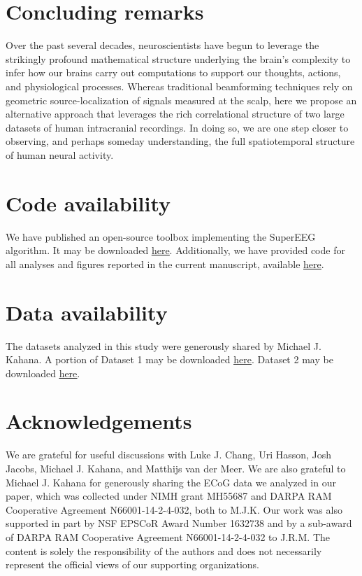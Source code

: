 \documentclass[11pt]{article}
\begin{document}
\section*{Concluding remarks}
Over the past several decades, neuroscientists
have begun to leverage the strikingly profound mathematical structure underlying
the brain's complexity to infer how our brains carry out computations to support
our thoughts, actions, and physiological processes.  Whereas traditional
beamforming techniques rely on geometric source-localization of signals measured
at the scalp, here we propose an alternative approach that leverages the rich
correlational structure of two large datasets of human intracranial recordings.
In doing so, we are one step closer to observing, and perhaps someday
understanding, the full spatiotemporal structure of human neural activity.

\section*{Code availability}
We have published an open-source toolbox
implementing the SuperEEG algorithm.  It may be downloaded
\href{https://supereeg.readthedocs.io/en/latest/}{\underline{here}}.
Additionally, we have provided code for all analyses and figures reported in the
current manuscript, available
\href{https://github.com/ContextLab/supereeg_paper}{\underline{here}}.

\section*{Data availability}
The datasets analyzed in this study were generously shared by Michael
J. Kahana.  A portion of Dataset 1 may be downloaded
\href{http://memory.psych.upenn.edu/Request_EEG_access?paper=SedeEtal03}{\underline{here}}.
Dataset 2 may be downloaded
\href{http://memory.psych.upenn.edu/Request_EEG_access?paper=EzzyEtal17}{\underline{here}}.

\section*{Acknowledgements}
We are grateful for useful discussions with Luke J.
Chang, Uri Hasson, Josh Jacobs, Michael J. Kahana, and Matthijs van der Meer.
We are also grateful to Michael J. Kahana for generously sharing the ECoG data
we analyzed in our paper, which was collected under NIMH grant MH55687 and DARPA
RAM Cooperative Agreement N66001-14-2-4-032, both to M.J.K.  Our work was also
supported in part by NSF EPSCoR Award Number 1632738 and by a sub-award of DARPA
RAM Cooperative Agreement N66001-14-2-4-032 to J.R.M.  The content is solely the
responsibility of the authors and does not necessarily represent the official
views of our supporting organizations.
\end{document}
